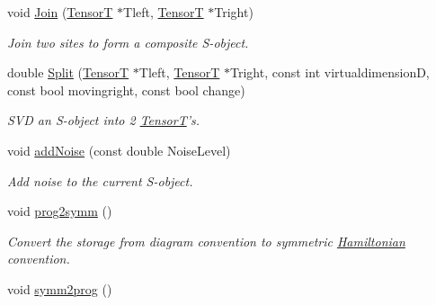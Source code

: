 \begin{DoxyCompactItemize}
void \hyperlink{classCheMPS2_1_1Sobject_a687a29eab89ef3763af8c630b48e3bf6}{Join} (\hyperlink{classCheMPS2_1_1TensorT}{Tensor\-T} $\ast$Tleft, \hyperlink{classCheMPS2_1_1TensorT}{Tensor\-T} $\ast$Tright)
\begin{DoxyCompactList}\small\item\em Join two sites to form a composite S-\/object. \end{DoxyCompactList}\item 
double \hyperlink{classCheMPS2_1_1Sobject_a34983e86ae9f19de0be6b923479c13df}{Split} (\hyperlink{classCheMPS2_1_1TensorT}{Tensor\-T} $\ast$Tleft, \hyperlink{classCheMPS2_1_1TensorT}{Tensor\-T} $\ast$Tright, const int virtualdimension\-D, const bool movingright, const bool change)
\begin{DoxyCompactList}\small\item\em S\-V\-D an S-\/object into 2 \hyperlink{classCheMPS2_1_1TensorT}{Tensor\-T}'s. \end{DoxyCompactList}\item 
void \hyperlink{classCheMPS2_1_1Sobject_abe676ef06644b5b675c65b123d118f2c}{add\-Noise} (const double Noise\-Level)
\begin{DoxyCompactList}\small\item\em Add noise to the current S-\/object. \end{DoxyCompactList}\item 
\hypertarget{classCheMPS2_1_1Sobject_a01b16408c5439e0eca69b2fde6d0185c}{void \hyperlink{classCheMPS2_1_1Sobject_a01b16408c5439e0eca69b2fde6d0185c}{prog2symm} ()}\label{classCheMPS2_1_1Sobject_a01b16408c5439e0eca69b2fde6d0185c}

\begin{DoxyCompactList}\small\item\em Convert the storage from diagram convention to symmetric \hyperlink{classCheMPS2_1_1Hamiltonian}{Hamiltonian} convention. \end{DoxyCompactList}\item 
\hypertarget{classCheMPS2_1_1Sobject_a2b482f6b45ddd735e42b906843c10e24}{void \hyperlink{classCheMPS2_1_1Sobject_a2b482f6b45ddd735e42b906843c10e24}{symm2prog} ()}\label{classCheMPS2_1_1Sobject_a2b482f6b45ddd735e42b906843c10e24}


\end{DoxyCompactItemize}
